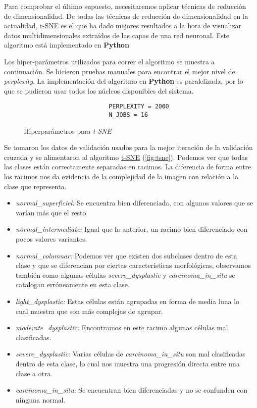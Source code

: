 Para comprobar el último supuesto, necesitaremos aplicar técnicas de reducción
de dimensionalidad. De todas las técnicas de reducción de dimensionalidad en la
actualidad, \hyperlink{abbr}{t-SNE} es el
que ha dado mejores resultados a la hora de visualizar datos multidimensionales
extraídos de las capas de una red neuronal. Este algoritmo está implementado en
\textbf{Python}

Los hiper-parámetros utilizados para correr el algoritmo se muestra a continuación. Se hicieron
pruebas manuales para encontrar el mejor nivel de \emph{perplexity}. La implementación
del algoritmo en \textbf{Python} es paralelizada, por lo que se pudieron usar todos los 
núcleos disponibles del sistema.

\begin{figure}[H]
    \centering
\begin{verbatim}
                        PERPLEXITY = 2000
                        N_JOBS = 16
\end{verbatim}
\caption{Hiperparámetros para \emph{t-SNE}}
\label{fig:hiper_tsne}
\end{figure}

Se tomaron los datos de validación usados para la mejor iteración de la
validación cruzada y se alimentaron al algoritmo \hyperlink{abbr}{t-SNE}
(\autoref{fig:tsne}). Podemos ver que todas las clases están correctamente
separadas en racimos. La diferencia de forma entre los racimos nos da evidencia
de la complejidad de la imagen con relación a la clase que representa.

\begin{itemize}
  \item{\emph{normal\_superficiel:}} Se encuentra bien diferenciada, con algunos valores que se varían
  más que el resto.
  \item{\emph{normal\_intermediate:}} Igual que la anterior, un racimo bien diferenciado con pocos valores
  variantes.
  \item{\emph{normal\_columnar:}} Podemos ver que existen dos subclases dentro de esta clase y que
  se diferencian por ciertas características morfológicas, observamos también como algunas células
  \emph{severe\_dysplastic} y \emph{carcinoma\_in\_situ} se catalogan erróneamente en esta clase.
  \item{\emph{light\_dysplastic:}} Estas células están agrupadas en forma de media luna lo cual
  muestra que son más complejas de agrupar.
  \item{\emph{moderate\_dysplastic:}} Encontramos en este racimo algunas células mal clasificadas.
  \item{\emph{severe\_dysplastic:}} Varias células de \emph{carcinoma\_in\_situ} son mal
  clasificadas dentro de esta clase, lo cual nos muestra una progresión directa entre una
  clase a otra.
  \item{\emph{carcinoma\_in\_situ:}} Se encuentran bien diferenciadas y no se confunden con
  ninguna normal.
\end{itemize}

